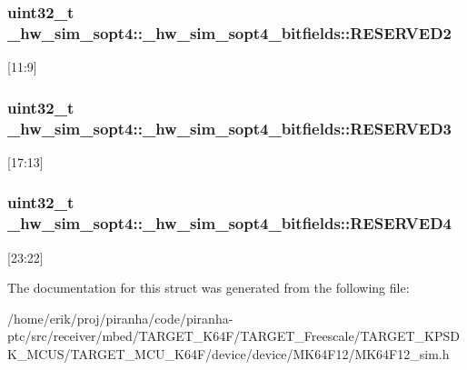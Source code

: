 \subsubsection[{\texorpdfstring{R\+E\+S\+E\+R\+V\+E\+D2}{RESERVED2}}]{\setlength{\rightskip}{0pt plus 5cm}uint32\+\_\+t \+\_\+hw\+\_\+sim\+\_\+sopt4\+::\+\_\+hw\+\_\+sim\+\_\+sopt4\+\_\+bitfields\+::\+R\+E\+S\+E\+R\+V\+E\+D2}\hypertarget{struct__hw__sim__sopt4_1_1__hw__sim__sopt4__bitfields_a5ebfb44ffb8cc458c7249ce4775f407b}{}\label{struct__hw__sim__sopt4_1_1__hw__sim__sopt4__bitfields_a5ebfb44ffb8cc458c7249ce4775f407b}
\mbox{[}11\+:9\mbox{]} 
\subsubsection[{\texorpdfstring{R\+E\+S\+E\+R\+V\+E\+D3}{RESERVED3}}]{\setlength{\rightskip}{0pt plus 5cm}uint32\+\_\+t \+\_\+hw\+\_\+sim\+\_\+sopt4\+::\+\_\+hw\+\_\+sim\+\_\+sopt4\+\_\+bitfields\+::\+R\+E\+S\+E\+R\+V\+E\+D3}\hypertarget{struct__hw__sim__sopt4_1_1__hw__sim__sopt4__bitfields_ad9bc3eb2cbee2d04135d1d50d05652b6}{}\label{struct__hw__sim__sopt4_1_1__hw__sim__sopt4__bitfields_ad9bc3eb2cbee2d04135d1d50d05652b6}
\mbox{[}17\+:13\mbox{]} 
\subsubsection[{\texorpdfstring{R\+E\+S\+E\+R\+V\+E\+D4}{RESERVED4}}]{\setlength{\rightskip}{0pt plus 5cm}uint32\+\_\+t \+\_\+hw\+\_\+sim\+\_\+sopt4\+::\+\_\+hw\+\_\+sim\+\_\+sopt4\+\_\+bitfields\+::\+R\+E\+S\+E\+R\+V\+E\+D4}\hypertarget{struct__hw__sim__sopt4_1_1__hw__sim__sopt4__bitfields_a546a8064994bc2770915b77a74824a34}{}\label{struct__hw__sim__sopt4_1_1__hw__sim__sopt4__bitfields_a546a8064994bc2770915b77a74824a34}
\mbox{[}23\+:22\mbox{]} 

The documentation for this struct was generated from the following file\+:\begin{DoxyCompactItemize}
\item 
/home/erik/proj/piranha/code/piranha-\/ptc/src/receiver/mbed/\+T\+A\+R\+G\+E\+T\+\_\+\+K64\+F/\+T\+A\+R\+G\+E\+T\+\_\+\+Freescale/\+T\+A\+R\+G\+E\+T\+\_\+\+K\+P\+S\+D\+K\+\_\+\+M\+C\+U\+S/\+T\+A\+R\+G\+E\+T\+\_\+\+M\+C\+U\+\_\+\+K64\+F/device/device/\+M\+K64\+F12/M\+K64\+F12\+\_\+sim.\+h\end{DoxyCompactItemize}

